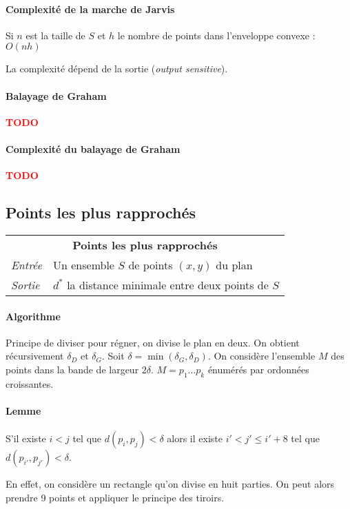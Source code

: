 \documentclass[french]{article}
\newcommand{\TODO}{\textcolor{red}{\textbf{TODO}}}
\begin{document}
\paragraph{Complexité de la marche de Jarvis} Si $n$ est la taille de $S$ et $h$ le nombre de points dans l'enveloppe convexe : $O(nh)$

La complexité dépend de la sortie (\emph{output sensitive}).


\paragraph{Balayage de Graham}\TODO

\paragraph{Complexité du balayage de Graham}\TODO

\subsection{Points les plus rapprochés}

\vspace{0.5cm}
\begin{tabularx}{\textwidth}{p{1cm}X}
\multicolumn{2}{c}{\textbf{Points les plus rapprochés}} \\ 
\emph{Entrée} & Un ensemble $S$ de points $(x,y)$ du plan \\ 
\emph{Sortie} & $d^*$ la distance minimale entre deux points de $S$ \\
\end{tabularx}

\paragraph{Algorithme}Principe de diviser pour régner, on divise le plan en deux. On obtient récursivement $\delta_D$ et $\delta_G$. Soit $\delta = \min (\delta_G, \delta_D)$. On considère l'ensemble $M$ des points dans la bande de largeur $2\delta$. $M = p_1 \ldots p_k$ énumérés par ordonnées croissantes.

\paragraph{Lemme}S'il existe $i < j$ tel que $d(p_i,p_j) < \delta$ alors il existe $i' < j' \leq i'+8$ tel que $d(p_{i'},p_{j'}) < \delta$.

En effet, on considère un rectangle qu'on divise en huit parties. On peut alors prendre 9 points et appliquer le principe des tiroirs.
\end{document}
